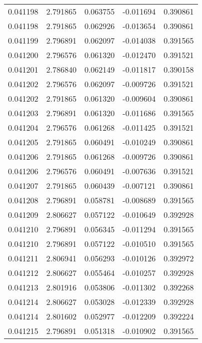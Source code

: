 \begin{tabular}{lrrrr}
0.041198    &  2.791865 &  0.063755 & -0.011694 &             0.390861 \\
0.041198    &  2.791865 &  0.062926 & -0.013654 &             0.390861 \\
0.041199    &  2.796891 &  0.062097 & -0.014038 &             0.391565 \\
0.041200    &  2.796576 &  0.061320 & -0.012470 &             0.391521 \\
0.041201    &  2.786840 &  0.062149 & -0.011817 &             0.390158 \\
0.041202    &  2.796576 &  0.062097 & -0.009726 &             0.391521 \\
0.041202    &  2.791865 &  0.061320 & -0.009604 &             0.390861 \\
0.041203    &  2.796891 &  0.061320 & -0.011686 &             0.391565 \\
0.041204    &  2.796576 &  0.061268 & -0.011425 &             0.391521 \\
0.041205    &  2.791865 &  0.060491 & -0.010249 &             0.390861 \\
0.041206    &  2.791865 &  0.061268 & -0.009726 &             0.390861 \\
0.041206    &  2.796576 &  0.060491 & -0.007636 &             0.391521 \\
0.041207    &  2.791865 &  0.060439 & -0.007121 &             0.390861 \\
0.041208    &  2.796891 &  0.058781 & -0.008689 &             0.391565 \\
0.041209    &  2.806627 &  0.057122 & -0.010649 &             0.392928 \\
0.041210    &  2.796891 &  0.056345 & -0.011294 &             0.391565 \\
0.041210    &  2.796891 &  0.057122 & -0.010510 &             0.391565 \\
0.041211    &  2.806941 &  0.056293 & -0.010126 &             0.392972 \\
0.041212    &  2.806627 &  0.055464 & -0.010257 &             0.392928 \\
0.041213    &  2.801916 &  0.053806 & -0.011302 &             0.392268 \\
0.041214    &  2.806627 &  0.053028 & -0.012339 &             0.392928 \\
0.041214    &  2.801602 &  0.052977 & -0.012209 &             0.392224 \\
0.041215    &  2.796891 &  0.051318 & -0.010902 &             0.391565 \\

\end{tabular}
